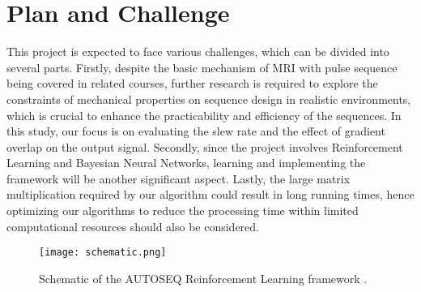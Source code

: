\section{Plan and Challenge}
This project is expected to face various challenges, which can be divided into several parts. Firstly, despite the basic mechanism of MRI with pulse sequence being covered in related courses, further research is required to explore the constraints of mechanical properties on sequence design in realistic environments, which is crucial to enhance the practicability and efficiency of the sequences. In this study, our focus is on evaluating the slew rate and the effect of gradient overlap on the output signal. Secondly, since the project involves Reinforcement Learning and Bayesian Neural Networks, learning and implementing the framework will be another significant aspect. Lastly, the large matrix multiplication required by our algorithm could result in long running times, hence optimizing our algorithms to reduce the processing time within limited computational resources should also be considered.

\begin{figure}[ht]
    \centering
    \texttt{[image: schematic.png]}
    \caption{Schematic of the AUTOSEQ Reinforcement Learning framework \citep{0438}.}
    \label{schematic}
\end{figure}